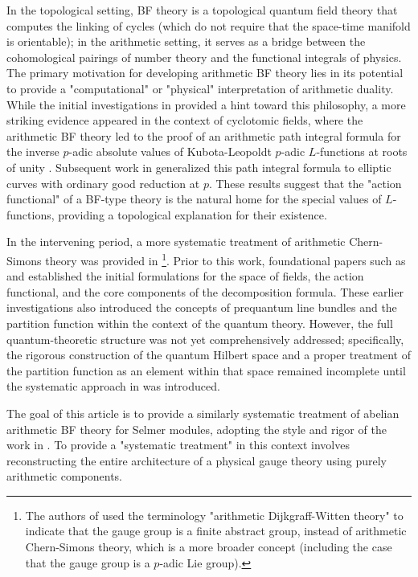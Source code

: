 \documentclass[a4paper]{amsart}
\theoremstyle{definition}
\numberwithin{equation}{section}
\begin{document}
In the topological setting, BF theory is a topological quantum field theory that computes the linking of cycles (which do not require that the space-time manifold is orientable); in the arithmetic setting, it serves as a bridge between the cohomological pairings of number theory and the functional integrals of physics. The primary motivation for developing arithmetic BF theory lies in its potential to provide a "computational" or "physical" interpretation of arithmetic duality. While the initial investigations in \cite{CaKi22} provided a hint toward this philosophy, a more striking evidence appeared in the context of cyclotomic fields, where the arithmetic BF theory led to the proof of an arithmetic path integral formula for the inverse $p$-adic absolute values of Kubota-Leopoldt $p$-adic $L$-functions at roots of unity \cite{CCKKPY}. 
Subsequent work in \cite{PP25} generalized this path integral formula to elliptic curves with ordinary good reduction at $p$. These results suggest that the "action functional" of a BF-type theory is the natural home for the special values of $L$-functions, providing a topological explanation for their existence.


In the intervening period, a more systematic treatment of arithmetic Chern-Simons theory was provided in \cite{HKM}\footnote{The authors of \cite{HKM} used the terminology "arithmetic Dijkgraff-Witten theory" to indicate that the gauge group is a finite abstract group, instead of arithmetic Chern-Simons theory, which is a more broader concept (including the case that the gauge group is a $p$-adic Lie group).}. Prior to this work, foundational papers such as \cite{CKKPY} and \cite{kim2} established the initial formulations for the space of fields, the action functional, and the core components of the decomposition formula. These earlier investigations also introduced the concepts of prequantum line bundles and the partition function within the context of the quantum theory. 
However, the full quantum-theoretic structure was not yet comprehensively addressed; specifically, the rigorous construction of the quantum Hilbert space and a proper treatment of the partition function as an element within that space remained incomplete until the systematic approach in \cite{HKM} was introduced.

The goal of this article is to provide a similarly systematic treatment of abelian arithmetic BF theory for Selmer modules, adopting the style and rigor of the work in \cite{HKM}. To provide a "systematic treatment" in this context involves reconstructing the entire architecture of a physical gauge theory using purely arithmetic components. 
\end{document}
